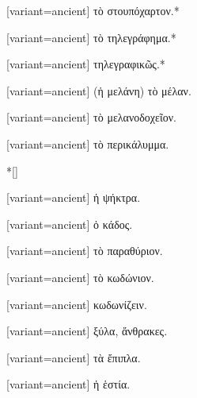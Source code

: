 \switchcolumn*
{}%
\switchcolumn
\begin{greek}[variant=ancient]%
τὸ στουπόχαρτον.{*}%
\end{greek}%
\switchcolumn*
{}%
\switchcolumn
\begin{greek}[variant=ancient]%
τὸ τηλεγράφημα.{*}%
\end{greek}%
\switchcolumn*
{}%
\switchcolumn
\begin{greek}[variant=ancient]%
τηλεγραφικῶς.{*}%
\end{greek}%
\switchcolumn*
{}%
\switchcolumn
\begin{greek}[variant=ancient]%
(ἡ μελάνη) τὸ μέλαν.%
\end{greek}%
\switchcolumn*
{}%
\switchcolumn
\begin{greek}[variant=ancient]%
τὸ μελανοδοχεῖον.%
\end{greek}%
\switchcolumn*
{}%
\switchcolumn
\begin{greek}[variant=ancient]%
τὸ περικάλυμμα.%
\end{greek}%
\switchcolumn*
\switchcolumn[0]*[\StarOrnament]%
\switchcolumn
\begin{greek}[variant=ancient]%
ἡ ψήκτρα.%
\end{greek}%
\switchcolumn*
{}%
\switchcolumn
\begin{greek}[variant=ancient]%
ὁ κάδος.%
\end{greek}%
\switchcolumn*
{}%
\switchcolumn
\begin{greek}[variant=ancient]%
τὸ παραθύριον.%
\end{greek}%
\switchcolumn*
{}%
\switchcolumn
\begin{greek}[variant=ancient]%
τὸ κωδώνιον.%
\end{greek}%
\switchcolumn*
{}%
\switchcolumn
\begin{greek}[variant=ancient]%
κωδωνίζειν.%
\end{greek}%
\switchcolumn*
{}%
\switchcolumn
\begin{greek}[variant=ancient]%
ξύλα, ἄνθρακες.%
\end{greek}%
\switchcolumn*
{}%
\switchcolumn
\begin{greek}[variant=ancient]%
τὰ ἔπιπλα.%
\end{greek}%
\switchcolumn*
{}%
\switchcolumn
\begin{greek}[variant=ancient]%
ἡ ἑστία.%
\end{greek}%

